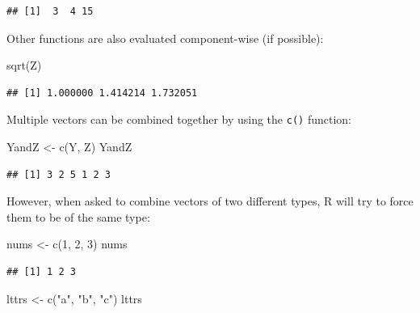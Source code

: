 \documentclass[
]{book}
\newenvironment{Shaded}{\begin{snugshade}}{\end{snugshade}}
\newcommand{\DecValTok}[1]{\textcolor[rgb]{0.00,0.00,0.81}{#1}}
\newcommand{\FunctionTok}[1]{\textcolor[rgb]{0.00,0.00,0.00}{#1}}
\newcommand{\NormalTok}[1]{#1}
\newcommand{\OtherTok}[1]{\textcolor[rgb]{0.56,0.35,0.01}{#1}}
\newcommand{\StringTok}[1]{\textcolor[rgb]{0.31,0.60,0.02}{#1}}
\begin{document}
\begin{verbatim}
## [1]  3  4 15
\end{verbatim}

Other functions are also evaluated component-wise (if possible):

\begin{Shaded}
\begin{Highlighting}[]
\FunctionTok{sqrt}\NormalTok{(Z)}
\end{Highlighting}
\end{Shaded}

\begin{verbatim}
## [1] 1.000000 1.414214 1.732051
\end{verbatim}

Multiple vectors can be combined together by using the \texttt{c()} function:

\begin{Shaded}
\begin{Highlighting}[]
\NormalTok{YandZ }\OtherTok{\textless{}{-}} \FunctionTok{c}\NormalTok{(Y, Z)}
\NormalTok{YandZ}
\end{Highlighting}
\end{Shaded}

\begin{verbatim}
## [1] 3 2 5 1 2 3
\end{verbatim}

However, when asked to combine vectors of two different types, R will try to force them to be of the same type:

\begin{Shaded}
\begin{Highlighting}[]
\NormalTok{nums }\OtherTok{\textless{}{-}} \FunctionTok{c}\NormalTok{(}\DecValTok{1}\NormalTok{, }\DecValTok{2}\NormalTok{, }\DecValTok{3}\NormalTok{)}
\NormalTok{nums}
\end{Highlighting}
\end{Shaded}

\begin{verbatim}
## [1] 1 2 3
\end{verbatim}

\begin{Shaded}
\begin{Highlighting}[]
\NormalTok{lttrs }\OtherTok{\textless{}{-}} \FunctionTok{c}\NormalTok{(}\StringTok{"a"}\NormalTok{, }\StringTok{"b"}\NormalTok{, }\StringTok{"c"}\NormalTok{)}
\NormalTok{lttrs}
\end{Highlighting}
\end{Shaded}
\end{document}
